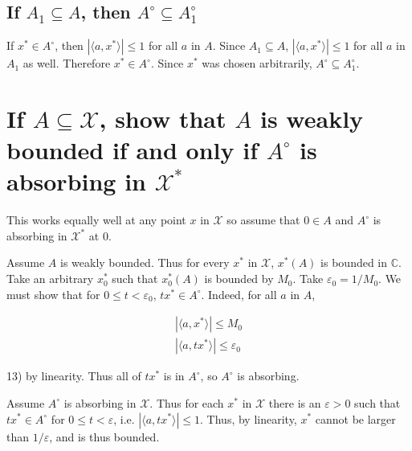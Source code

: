 \documentclass{article}
\begin{document}
\subsection{If $A_1 \subseteq A$, then $A^{\circ} \subseteq A^{\circ}_1$}

If $x^* \in A^{\circ}$, then $| \langle a,x^* \rangle | \le 1$ for all $a$ in $A$. Since $A_1 \subseteq A$,  $| \langle a,x^* \rangle | \le 1$ for all $a$ in $A_1$ as well. Therefore $x^* \in A^{\circ}$. Since $x^*$ was chosen arbitrarily,  $A^{\circ} \subseteq A^{\circ}_1$.


\section{If $A\subseteq\mathscr{X}$, show that $A$ is weakly bounded if and only if $A^{\circ}$ is absorbing in $\mathscr{X}^*$}

This works equally well at any point $x$ in $\mathscr{X}$ so assume that $0 \in A$ and  $A^{\circ}$ is absorbing in $\mathscr{X}^*$ at $0$.

Assume $A$ is weakly bounded. Thus for every $x^*$ in $\mathscr{X}$, $x^*(A)$ is bounded in $\mathbb{C}$. Take an arbitrary $x^*_0$ such that $x^*_0(A)$ is bounded by $M_0$. Take $\varepsilon_0 = 1 / M_0$. We must show that for $0 \le t < \varepsilon_0$, $tx^* \in A^{\circ}$. Indeed, for all $a$ in $A$, 

\begin{align}
|\langle a, x^* \rangle | \le M_0 \\
|\langle a, t x^* \rangle | \le \varepsilon_0 
\end{align}

13) by linearity. Thus all of $t x^*$ is in $A^{\circ}$, so $A^{\circ}$ is absorbing.


Assume $A^{\circ}$ is absorbing in $\mathscr{X}$. Thus for each $x^*$ in $\mathscr{X}$ there is an $\varepsilon > 0$ such that $tx^* \in A^{\circ}$ for $0 \le t < \varepsilon$, i.e. $| \langle a, t x^* \rangle | \le 1$. Thus, by linearity, $x^*$ cannot be larger than $1/\varepsilon$, and is thus bounded.
\end{document}
